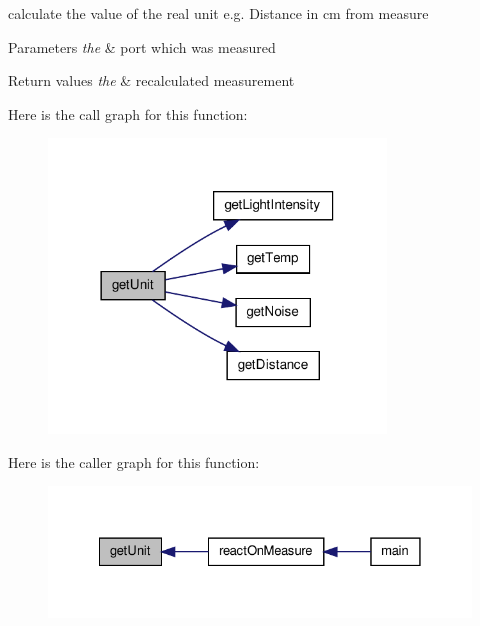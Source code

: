 calculate the value of the real unit e.\-g. \-Distance in cm from measure 


\begin{DoxyParams}{\-Parameters}
{\em the} & port which was measured \\
\hline
\end{DoxyParams}

\begin{DoxyRetVals}{\-Return values}
{\em the} & recalculated measurement \\
\hline
\end{DoxyRetVals}


\-Here is the call graph for this function\-:\nopagebreak
\begin{figure}[H]
\begin{center}
\leavevmode
\includegraphics[width=254pt]{group__main_ga6c19b333de1e78f3afe985109ed1af2f_cgraph}
\end{center}
\end{figure}




\-Here is the caller graph for this function\-:\nopagebreak
\begin{figure}[H]
\begin{center}
\leavevmode
\includegraphics[width=328pt]{group__main_ga6c19b333de1e78f3afe985109ed1af2f_icgraph}
\end{center}
\end{figure}


